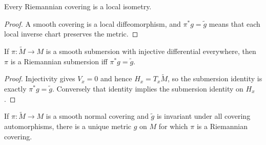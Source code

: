 \begin{lemma}
\label{lem:riemannian-covering-local-isometry}





Every Riemannian covering is a local isometry.
\end{lemma}

\begin{proof}

\sketch A smooth covering is a local diffeomorphism, and $\pi^*g=\tilde g$ means that each local inverse chart preserves the metric.
\end{proof}

\begin{proposition}
\label{prop:equidimensional-riemannian-submersion-local-isometry}





If $\pi:\tilde M\to M$ is a smooth submersion with injective differential everywhere, then $\pi$ is a Riemannian submersion iff $\pi^*g=\tilde g$.
\end{proposition}

\begin{proof}

\sketch Injectivity gives $V_x=0$ and hence $H_x=T_x\tilde M$, so the submersion identity is exactly $\pi^*g=\tilde g$. Conversely that identity implies the submersion identity on $H_x$.
\end{proof}

\begin{proposition}
\label{prop:riemannian-covering-metric}





If $\pi:\tilde M\to M$ is a smooth normal covering and $\tilde g$ is invariant under all covering automorphisms, there is a unique metric $g$ on $M$ for which $\pi$ is a Riemannian covering.
\end{proposition}

